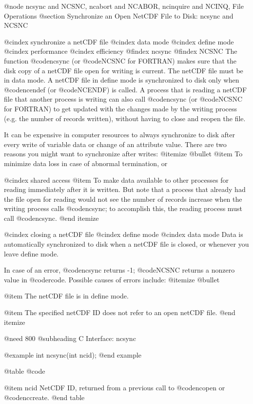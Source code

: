 @node ncsync and NCSNC, ncabort and NCABOR, ncinquire and NCINQ, File Operations
@section Synchronize an Open NetCDF File to Disk:  ncsync and NCSNC

@cindex synchronize a netCDF file
@cindex data mode
@cindex define mode
@cindex performance
@cindex efficiency
@findex ncsync
@findex NCSNC
The function @code{ncsync} (or @code{NCSNC} for FORTRAN) makes sure that
the disk copy of a netCDF file open for writing is current.  The netCDF
file must be in data mode.  A netCDF file in define mode is synchronized
to disk only when @code{ncendef} (or @code{NCENDF}) is called.  A
process that is reading a netCDF file that another process is writing
can also call @code{ncsync} (or @code{NCSNC} for FORTRAN) to get updated
with the changes made by the writing process (e.g. the number of records
written), without having to close and reopen the file.

It can be expensive in computer resources to always synchronize to disk
after every write of variable data or change of an attribute value.
There are two reasons you might want to synchronize after writes:
@itemize @bullet
@item
To minimize data loss in case of abnormal termination, or

@cindex shared access
@item
To make data available to other processes for reading immediately after it
is written.  But note that a process that already had the file open for
reading would not see the number of records increase when the writing
process calls @code{ncsync}; to accomplish this, the reading process
must call @code{ncsync}.
@end itemize

@cindex closing a netCDF file
@cindex define mode
@cindex data mode
Data is automatically synchronized to disk when a netCDF file is closed,
or whenever you leave define mode.

In case of an error, @code{ncsync} returns -1; @code{NCSNC} returns a
nonzero value in @code{rcode}.  Possible causes of errors include:
@itemize @bullet

@item
The netCDF file is in define mode.

@item
The specified netCDF ID does not refer to an open netCDF file.
@end itemize

@need 800
@subheading C Interface:  ncsync

@example
int ncsync(int ncid);
@end example

@table @code

@item ncid
NetCDF ID, returned from a previous call to @code{ncopen} or @code{nccreate}.
@end table

